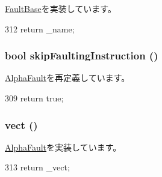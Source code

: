 \hyperlink{classFaultBase_aad960357563b8b969d2dffdcc6861de7}{FaultBase}を実装しています。


\begin{DoxyCode}
312 {return _name;}
\end{DoxyCode}
\hypertarget{classAlphaISA_1_1PalFault_a4dca22d2e3f19609672fe85bb5e28b56}{
\subsubsection[{skipFaultingInstruction}]{\setlength{\rightskip}{0pt plus 5cm}bool skipFaultingInstruction ()}}
\label{classAlphaISA_1_1PalFault_a4dca22d2e3f19609672fe85bb5e28b56}


\hyperlink{classAlphaISA_1_1AlphaFault_a5d44c6b9ce6041b3e9235e8d978156cb}{AlphaFault}を再定義しています。


\begin{DoxyCode}
309 {return true;}
\end{DoxyCode}
\hypertarget{classAlphaISA_1_1PalFault_ae15c5d7ab0162821b93d668d0b225198}{
\subsubsection[{vect}]{ vect ()}}
\label{classAlphaISA_1_1PalFault_ae15c5d7ab0162821b93d668d0b225198}


\hyperlink{classAlphaISA_1_1AlphaFault_ac141ef2ab527bd4d5c079ddff2e8b4aa}{AlphaFault}を実装しています。


\begin{DoxyCode}
313 {return _vect;}
\end{DoxyCode}



